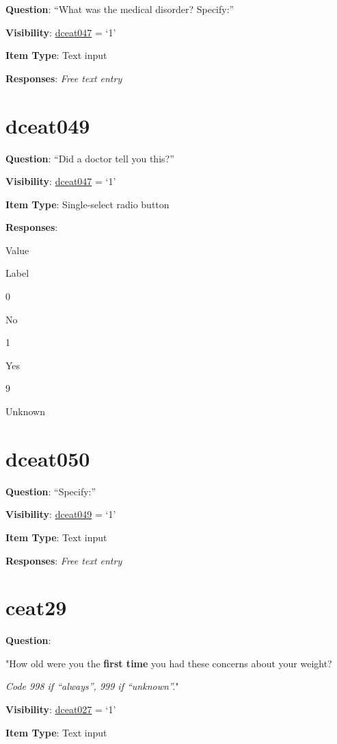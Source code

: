 \documentclass[]{book}
\begin{document}
\textbf{Question}: ``What was the medical disorder? Specify:''

\textbf{Visibility}: \protect\hyperlink{dceat047}{dceat047} = `1'

\textbf{Item Type}: Text input

\textbf{Responses}: \emph{Free text entry}

\hypertarget{dceat049}{%
\section{dceat049}\label{dceat049}}

\textbf{Question}: ``Did a doctor tell you this?''

\textbf{Visibility}: \protect\hyperlink{dceat047}{dceat047} = `1'

\textbf{Item Type}: Single-select radio button

\textbf{Responses}:

Value

Label

0

No

1

Yes

9

Unknown

\hypertarget{dceat050}{%
\section{dceat050}\label{dceat050}}

\textbf{Question}: ``Specify:''

\textbf{Visibility}: \protect\hyperlink{dceat049}{dceat049} = `1'

\textbf{Item Type}: Text input

\textbf{Responses}: \emph{Free text entry}

\hypertarget{ceat29}{%
\section{ceat29}\label{ceat29}}

\textbf{Question}:

"How old were you the \textbf{first time} you had these concerns about your weight?

\emph{Code 998 if ``always'', 999 if ``unknown''.}"

\textbf{Visibility}: \protect\hyperlink{dceat027}{dceat027} = `1'

\textbf{Item Type}: Text input
\end{document}
